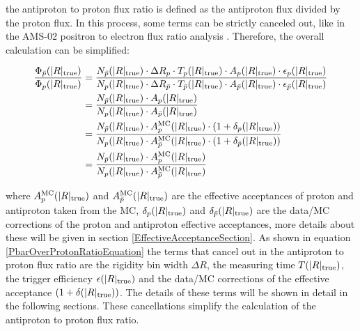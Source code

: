 the antiproton to proton flux ratio is defined as the antiproton flux divided by the proton flux. In this process, some terms can be strictly canceled out, like in the AMS-02 positron to electron flux ratio analysis \cite{ZimmermannPhDThesis}. Therefore, the overall calculation can be simplified:

\begin{equation} 
\begin{aligned}  
\frac{\Phi_{\bar{p}}(|R|_{\rm{true}})}{\Phi_{p}(|R|_{\rm{true}})} &= \frac{N_{\bar{p}}(|R|_{\rm{true}}) \cdot \Delta R_{p} \cdot T_{p}(|R|_{\rm{true}}) \cdot A_{p}(|R|_{\rm{true}}) \cdot \epsilon_{p}(|R|_{\rm{true}}) }{ N_{p}(|R|_{\rm{true}}) \cdot \Delta R_{\bar{p}} \cdot T_{\bar{p}}(|R|_{\rm{true}}) \cdot A_{\bar{p}}(|R|_{\rm{true}}) \cdot \epsilon_{\bar{p}}(|R|_{\rm{true}}) } \\ 
&= \frac{N_{\bar{p}}(|R|_{\rm{true}}) \cdot A_{p}(|R|_{\rm{true}})}{N_{p}(|R|_{\rm{true}}) \cdot A_{\bar{p}}(|R|_{\rm{true}})} \\ 
&= \frac{N_{\bar{p}}(|R|_{\rm{true}}) \cdot A^\mathrm{MC}_{p}(|R|_{\rm{true}}) \cdot (1+\delta_{p}(|R|_{\rm{true}}))}{N_{p}(|R|_{\rm{true}}) \cdot A^\mathrm{MC}_{\bar{p}}(|R|_{\rm{true}}) \cdot (1+\delta_{\bar{p}}(|R|_{\rm{true}}))} \\ 
& = \frac{N_{\bar{p}}(|R|_{\rm{true}}) \cdot A^\mathrm{MC}_{p}(|R|_{\rm{true}})}{N_{p}(|R|_{\rm{true}}) \cdot A^\mathrm{MC}_{\bar{p}}(|R|_{\rm{true}})}
\end{aligned}
\label{PbarOverProtonRatioEquation}
\end{equation}

where $A^{\mathrm{MC}}_{p}(|R|_{\rm{true}})$ and $A^{\mathrm{MC}}_{\bar{p}}(|R|_{\rm{true}})$ are the effective acceptances of proton and antiproton taken from the MC, $\delta_{p}(|R|_{\rm{true}})$ and $\delta_{\bar{p}}(|R|_{\rm{true}})$ are the data/MC corrections of the proton and antiproton effective acceptances, more details about these will be given in section \ref{EffectiveAcceptanceSection}. As shown in equation \ref{PbarOverProtonRatioEquation} the terms that cancel out in the antiproton to proton flux ratio are the rigidity bin width $\Delta R$, the measuring time $T(|R|_{\rm{true}})$, the trigger efficiency $\epsilon(|R|_{\rm{true}})$ and the data/MC corrections of the effective acceptance $(1+\delta(|R|_{\rm{true}}))$. The details of these terms will be shown in detail in the following sections. These cancellations simplify the calculation of the antiproton to proton flux ratio.  \par


